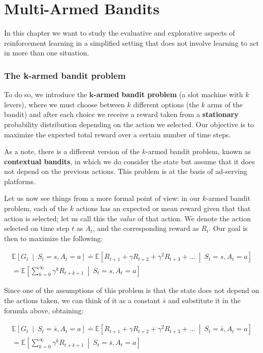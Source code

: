 \section{Multi-Armed Bandits}
In this chapter we want to study the evaluative and explorative aspects of reinforcement learning in a simplified setting that does not involve learning to act in more than one situation.

\subsubsection{The k-armed bandit problem}
To do so, we introduce the \textbf{$\boldsymbol{k}$-armed bandit problem} (a slot machine with $k$ levers), where we must choose between $k$ different options (the $k$ arms of the bandit) and after each choice we receive a reward taken from a \textbf{stationary} probability distribution depending on the action we selected. Our objective is to maximize the expected total reward over a certain number of time steps.

As a note, there is a different version of the $k$-armed bandit problem, known as \textbf{contextual bandits}, in which we do consider the state but assume that it does not depend on the previous actions. This problem is at the basis of ad-serving platforms.

Let us now see things from a more formal point of view: in our $k$-armed bandit problem, each of the $k$ actions has an expected or mean reward given that that action is selected; let us call this the \textit{value} of that action. We denote the action selected on time step $t$ as $A_t$, and the corresponding reward as $R_t$. Our goal is then to maximize the following:

\begin{gather*}
    \mathbb{E} \left[ G_t \  \middle\vert \  S_t = s, A_t = a \right] \doteq \mathbb{E} \left[ R_{t+1} + \gamma R_{t+2} + \gamma^2 R_{t+3} + ... \  \middle\vert \  S_t = s, A_t = a \right] \\
    = \mathbb{E} \left[ \sum_{k=0}^{\infty} \gamma^k R_{t+k+1} \  \middle\vert \  S_t = s, A_t = a \right]
\end{gather*}

Since one of the assumptions of this problem is that the state does not depend on the actions taken, we can think of it as a constant $\bar{s}$ and substitute it in the formula above, obtaining:

\begin{gather*}
    \mathbb{E} \left[ G_t \  \middle\vert \  S_t = \bar{s}, A_t = a \right] \doteq \mathbb{E} \left[ R_{t+1} + \gamma R_{t+2} + \gamma^2 R_{t+3} + ... \  \middle\vert \  S_t = \bar{s}, A_t = a \right] \\
    = \mathbb{E} \left[ \sum_{k=0}^{\infty} \gamma^k R_{t+k+1} \  \middle\vert \  S_t = \bar{s}, A_t = a \right]
\end{gather*}

